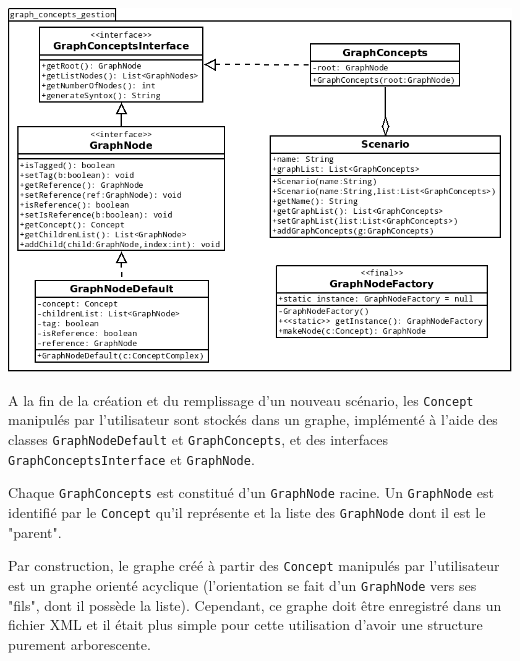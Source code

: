 \documentclass[12pt]{report}
\begin{document}
\begin{center}
\includegraphics[scale=0.5]{DiagLinguistic_graph_concepts_gestion.png}
\end{center}

A la fin de la création et du remplissage d'un nouveau scénario, les \texttt{Concept} manipulés par l'utilisateur sont stockés dans un graphe, implémenté à l'aide des classes \texttt{GraphNodeDefault} et \texttt{GraphConcepts}, et des interfaces \texttt{GraphConceptsInterface} et \texttt{GraphNode}.

Chaque \texttt{GraphConcepts} est constitué d'un \texttt{GraphNode} racine. Un \texttt{GraphNode} est identifié par le \texttt{Concept} qu'il représente et la liste des \texttt{GraphNode} dont il est le "parent".

\bigskip

Par construction, le graphe créé à partir des \texttt{Concept} manipulés par l'utilisateur est un graphe orienté acyclique (l'orientation se fait d'un \texttt{GraphNode} vers ses "fils", dont il possède la liste). Cependant, ce graphe doit être enregistré dans un fichier XML et il était plus simple pour cette utilisation d'avoir une structure purement arborescente. 
\end{document}
